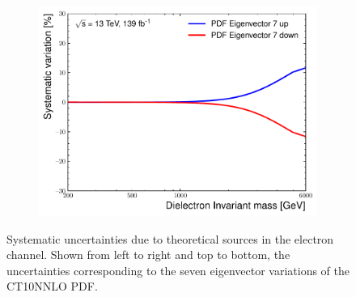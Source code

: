 \begin{figure}[h!]
\begin{subfigure}[b]{0.42\textwidth}
        \includegraphics[width=\textwidth]{figures/analysis/datamc/Uncertainties/theory/ee/backgroundTemplate_KF_PDF_EV7.pdf}
        \label{fig:uncert:eepdfvar7}
    \end{subfigure}
    \caption{Systematic uncertainties due to theoretical sources in the electron channel. Shown from left to right and top to bottom, the uncertainties corresponding to the seven eigenvector variations of the CT10NNLO PDF.}
    \label{fig:ucnert:eepdfvar}
\end{figure}

